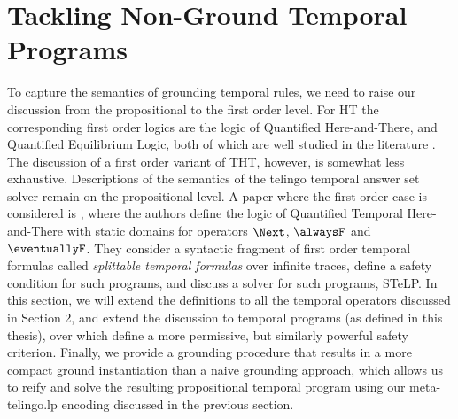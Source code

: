 \section{Tackling Non-Ground Temporal Programs}

To capture the semantics of grounding temporal rules, we need to raise
our discussion from the propositional to the first order level. For HT
the corresponding first order logics are the logic of Quantified
Here-and-There, and Quantified Equilibrium Logic, both of which are
well studied in the literature \cite{peaval06a} \cite{peaval08a}. The
discussion of a first order variant of THT, however, is somewhat less
exhaustive. Descriptions of the semantics of the telingo temporal
answer set solver remain on the propositional level. A paper where the
first order case is considered is \cite{agcapevidi17a}, where the
authors define the logic of Quantified Temporal Here-and-There with
static domains for operators $\Next$, $\alwaysF$ and
$\eventuallyF$. They consider a syntactic fragment of first order
temporal formulas called \emph{splittable temporal formulas} over
infinite traces, define a safety condition for such programs, and
discuss a solver for such programs, STeLP. In this section, we will
extend the definitions to all the temporal operators discussed in
Section 2, and extend the discussion to temporal programs (as defined
in this thesis), over which define a more permissive, but similarly
powerful safety criterion. Finally, we provide a grounding procedure
that results in a more compact ground instantiation than a naive
grounding approach, which allows us to reify and solve the resulting
propositional temporal program using our meta-telingo.lp encoding
discussed in the previous section.




